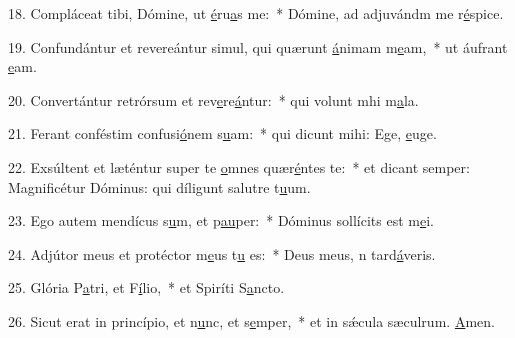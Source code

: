 18. Compláceat tibi, Dómine, ut \uline{é}ru\uline{a}s me:~* Dómine, ad adjuvándm me r\uline{é}spice.\par 
19. Confundántur et revereántur simul, qui quærunt \uline{á}nimam m\uline{e}am,~* ut áufrant \uline{e}am.\par 
20. Convertántur retrórsum et rev\uline{e}re\uline{á}ntur:~* qui volunt mhi m\uline{a}la.\par 
21. Ferant conféstim confusi\uline{ó}nem s\uline{u}am:~* qui dicunt mihi: Ege, \uline{e}uge.\par 
22. Exsúltent et læténtur super te \uline{o}mnes quær\uline{é}ntes te:~* et dicant semper: Magnificétur Dóminus: qui díligunt salutre t\uline{u}um.\par 
23. Ego autem mendícus s\uline{u}m, et p\uline{au}per:~* Dóminus sollícits est m\uline{e}i.\par 
24. Adjútor meus et protéctor m\uline{e}us t\uline{u} es:~* Deus meus, n tard\uline{á}veris.\par 
25. Glória P\uline{a}tri, et F\uline{í}lio,~* et Spiríti S\uline{a}ncto.\par 
26. Sicut erat in princípio, et n\uline{u}nc, et s\uline{e}mper,~* et in sǽcula sæculrum. \uline{A}men.\par 
